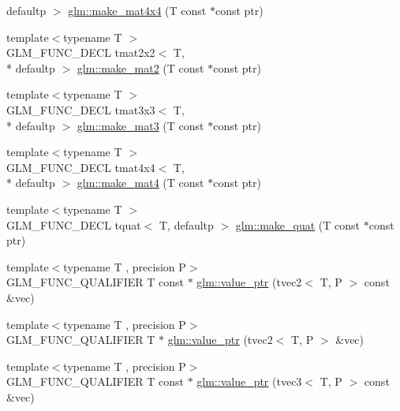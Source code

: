 \begin{DoxyCompactItemize}
defaultp $>$ \hyperlink{group__gtc__type__ptr_gaf605a5f5e2ff594e8d404b2855b09541}{glm\-::make\-\_\-mat4x4} (T const $\ast$const ptr)
\item 
{\footnotesize template$<$typename T $>$ }\\G\-L\-M\-\_\-\-F\-U\-N\-C\-\_\-\-D\-E\-C\-L tmat2x2$<$ T, \\*
defaultp $>$ \hyperlink{group__gtc__type__ptr_ga52a16e333fef7e33ca740779482a8693}{glm\-::make\-\_\-mat2} (T const $\ast$const ptr)
\item 
{\footnotesize template$<$typename T $>$ }\\G\-L\-M\-\_\-\-F\-U\-N\-C\-\_\-\-D\-E\-C\-L tmat3x3$<$ T, \\*
defaultp $>$ \hyperlink{group__gtc__type__ptr_gac2bc10c519ffc8db9e24f325f23787ea}{glm\-::make\-\_\-mat3} (T const $\ast$const ptr)
\item 
{\footnotesize template$<$typename T $>$ }\\G\-L\-M\-\_\-\-F\-U\-N\-C\-\_\-\-D\-E\-C\-L tmat4x4$<$ T, \\*
defaultp $>$ \hyperlink{group__gtc__type__ptr_ga2c6e6d457cb932e1ce683e4f690a6f60}{glm\-::make\-\_\-mat4} (T const $\ast$const ptr)
\item 
{\footnotesize template$<$typename T $>$ }\\G\-L\-M\-\_\-\-F\-U\-N\-C\-\_\-\-D\-E\-C\-L tquat$<$ T, defaultp $>$ \hyperlink{group__gtc__type__ptr_gaadafb6600af2633e4c98cc64c72f5269}{glm\-::make\-\_\-quat} (T const $\ast$const ptr)
\item 
{\footnotesize template$<$typename T , precision P$>$ }\\G\-L\-M\-\_\-\-F\-U\-N\-C\-\_\-\-Q\-U\-A\-L\-I\-F\-I\-E\-R T const $\ast$ \hyperlink{group__gtc__type__ptr_gafb01331238d8899dde700cb9b5dc6ef3}{glm\-::value\-\_\-ptr} (tvec2$<$ T, P $>$ const \&vec)
\item 
{\footnotesize template$<$typename T , precision P$>$ }\\G\-L\-M\-\_\-\-F\-U\-N\-C\-\_\-\-Q\-U\-A\-L\-I\-F\-I\-E\-R T $\ast$ \hyperlink{group__gtc__type__ptr_gabd3cc713184a2093862605f5f0abb8a4}{glm\-::value\-\_\-ptr} (tvec2$<$ T, P $>$ \&vec)
\item 
{\footnotesize template$<$typename T , precision P$>$ }\\G\-L\-M\-\_\-\-F\-U\-N\-C\-\_\-\-Q\-U\-A\-L\-I\-F\-I\-E\-R T const $\ast$ \hyperlink{group__gtc__type__ptr_gac04db5d9c05bd3d50140f34f8695a08c}{glm\-::value\-\_\-ptr} (tvec3$<$ T, P $>$ const \&vec)
\item 

\end{DoxyCompactItemize}
